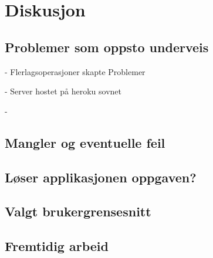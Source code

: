 \chapter[diskusjon]{Diskusjon}

\section{Problemer som oppsto underveis}

- Flerlagsoperasjoner skapte Problemer

- Server hostet på heroku sovnet

- 

\section{Mangler og eventuelle feil}

\section{Løser applikasjonen oppgaven?}

\section{Valgt brukergrensesnitt}

\section{Fremtidig arbeid}
